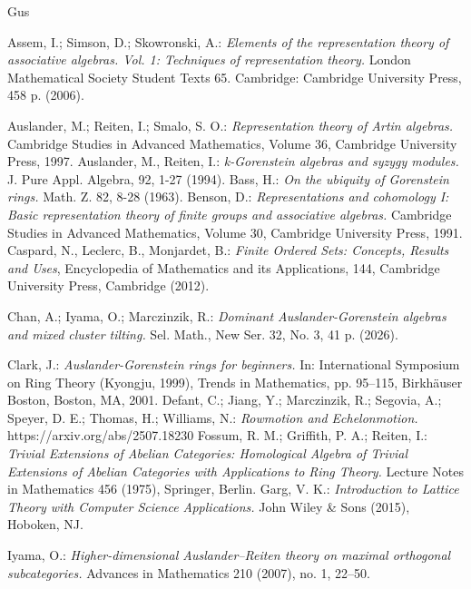 \documentclass[a4paper]{amsart}
\theoremstyle{definition}
\theoremstyle{remark}
\numberwithin{equation}{section}
\begin{document}
\begin{thebibliography}{Gus}





 Assem, I.; Simson, D.; Skowronski, A.: {\it Elements of the representation theory of associative algebras. Vol. 1: Techniques of representation theory. } London Mathematical Society Student Texts 65. Cambridge: Cambridge University Press, 458 p. (2006). 

 Auslander, M.; Reiten, I.; Smalo, S. O.: {\it Representation theory of Artin algebras.} Cambridge Studies in Advanced Mathematics, Volume 36, Cambridge University Press, 1997.  
Auslander, M., Reiten, I.: {\it k-Gorenstein algebras and syzygy modules.} J. Pure Appl. Algebra, 92, 1-27 (1994).
 Bass, H.: {\it On the ubiquity of Gorenstein rings.} Math. Z. 82, 8-28 (1963).
 Benson, D.: {\it Representations and cohomology I: Basic representation theory of finite groups and associative algebras.} Cambridge Studies in Advanced Mathematics, Volume 30, Cambridge University Press, 1991.
 Caspard, N., Leclerc, B., Monjardet, B.: {\it Finite Ordered Sets: Concepts, Results and Uses}, Encyclopedia of Mathematics and its Applications, 144, Cambridge University Press, Cambridge (2012).

 Chan, A.; Iyama, O.; Marczinzik, R.: {\it Dominant Auslander-Gorenstein algebras and mixed cluster tilting.} Sel. Math., New Ser. 32, No. 3, 41 p. (2026).


 Clark, J.: {\it Auslander-Gorenstein rings for beginners.} In: International Symposium on Ring Theory (Kyongju, 1999), Trends in Mathematics, pp. 95--115, Birkh\"auser Boston, Boston, MA, 2001.
 Defant, C.; Jiang, Y.; Marczinzik, R.; Segovia, A.; Speyer, D. E.; Thomas, H.; Williams, N.: {\it Rowmotion and Echelonmotion.} https://arxiv.org/abs/2507.18230
Fossum, R. M.; Griffith, P. A.; Reiten, I.:
{\it Trivial Extensions of Abelian Categories: Homological Algebra of
Trivial Extensions of Abelian Categories with Applications to Ring Theory.}
Lecture Notes in Mathematics 456 (1975), Springer, Berlin.
Garg, V. K.:
{\it Introduction to Lattice Theory with Computer Science Applications.}
John Wiley \& Sons (2015), Hoboken, NJ.

 Iyama, O.: {\it Higher-dimensional Auslander--Reiten theory on maximal orthogonal subcategories.} Advances in Mathematics 210 (2007), no. 1, 22--50.



\end{thebibliography}
\end{document}
